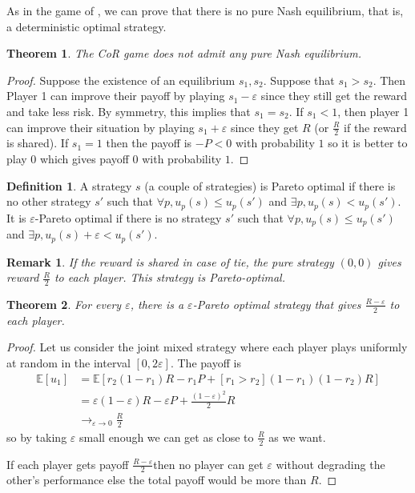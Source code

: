 \documentclass[preprint,12pt,authoryear,doubleblind]{elsarticle}
\newtheorem{theorem}{Theorem}[section]
\newtheorem*{remark}{Remark}
\theoremstyle{definition}
\newtheorem{definition}{Definition}[section]
\begin{document}
As in the game of \cite{Lotker2008-tx}, we can prove that there is no pure Nash equilibrium, that is, a deterministic optimal strategy.

\begin{theorem}
The CoR game does not admit any pure Nash equilibrium.
\end{theorem}
\begin{proof}
Suppose the existence of an equilibrium $s_1, s_2$. Suppose that $s_1 > s_2$. Then Player 1 can improve their payoff by playing $s_1 - \varepsilon$ since they still get the reward and take less risk. By symmetry, this implies that $s_1 = s_2$. If $s_1 < 1$, then player 1 can improve their situation by playing $s_1 + \varepsilon$ since they get $R$ (or $\frac{R}{2}$ if the reward is shared). If $s_1 = 1$ then the payoff is $-P < 0$ with probability $1$ so it is better to play $0$ which gives payoff $0$ with probability $1$.
\end{proof}

\begin{definition}A strategy $s$ (a couple of strategies) is Pareto optimal if there is no other strategy $s'$ such that $\forall p, u_p(s) \le u_p(s')$ and $\exists p, u_p(s) < u_p(s')$. It is $\varepsilon$-Pareto optimal if there is no strategy $s'$ such that $\forall p, u_p(s) \le u_p(s')$ and $\exists p, u_p(s) + \varepsilon < u_p(s')$.
\end{definition}
\begin{remark} If the reward is shared in case of tie, the pure strategy $(0,0)$ gives reward $\frac{R}{2}$ to each player. This strategy is Pareto-optimal.
\end{remark}
\begin{theorem}
\label{thm:pareto}
For every $\varepsilon$, there is a $\varepsilon$-Pareto optimal strategy that gives $\frac{R - \varepsilon}{2}$ to each player.
\end{theorem}
\begin{proof}
Let us consider the joint mixed strategy where each player plays uniformly at random in the interval $[0, 2 \varepsilon]$. The payoff is
\begin{align*} \mathbb{E}[u_1] &= \mathbb{E}\left[ r_2 (1-r_1) R - r_1 P + [ r_1 > r_2 ](1-r_1)(1-r_2) R\right] \\ &= \varepsilon (1-\varepsilon) R - \varepsilon P + \frac{(1-\varepsilon)^2}{2} R \\
&\rightarrow_{\varepsilon \rightarrow 0} \frac{R}{2} \end{align*}
so by taking $\varepsilon$ small enough we can get as close to $\frac{R}{2}$ as we want.

If each player gets payoff $\frac{R - \varepsilon}{2}$then no player can get $\varepsilon$ without degrading the other’s performance else the total payoff would be more than $R$.
\end{proof}
\end{document}

